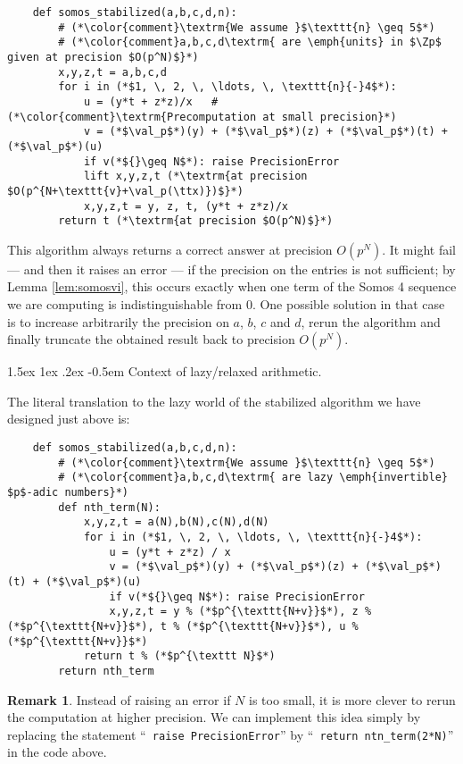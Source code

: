 \documentclass[11pt]{article}
\makeatletter
\numberwithin{equation}{section}
\numberwithin{figure}{section}
\renewcommand\subparagraph{\@startsection{subparagraph}{5}{\z@}%
                                       {1.5ex \@plus1ex \@minus .2ex}%
                                       {-0.5em}%
                                      {\normalfont\normalsize\it}}
\renewcommand{\geq}{\geqslant}
\theoremstyle{definition}
\newtheorem{rem}[theo]{Remark}
\newcommand{\Z}{\mathbb Z}
\newcommand{\Zp}{\Z_p}
\newcommand{\val}{\text{\rm val}}
\newcommand{\ttx}{\texttt{\rm x}\xspace}
\makeatother
\begin{document}
\begin{lstlisting}
    def somos_stabilized(a,b,c,d,n):
        # (*\color{comment}\textrm{We assume }$\texttt{n} \geq 5$*)
        # (*\color{comment}a,b,c,d\textrm{ are \emph{units} in $\Zp$ given at precision $O(p^N)$}*)
        x,y,z,t = a,b,c,d
        for i in (*$1, \, 2, \, \ldots, \, \texttt{n}{-}4$*):
            u = (y*t + z*z)/x   # (*\color{comment}\textrm{Precomputation at small precision}*)
            v = (*$\val_p$*)(y) + (*$\val_p$*)(z) + (*$\val_p$*)(t) + (*$\val_p$*)(u)
            if v(*${}\geq N$*): raise PrecisionError
            lift x,y,z,t (*\textrm{at precision $O(p^{N+\texttt{v}+\val_p(\ttx)})$}*)
            x,y,z,t = y, z, t, (y*t + z*z)/x
        return t (*\textrm{at precision $O(p^N)$}*)
\end{lstlisting}

\noindent
This algorithm always returns a correct answer at precision $O(p^N)$. 
It might fail --- and then it raises an error --- if the precision on the 
entries is not sufficient; by Lemma \ref{lem:somosvi}, this occurs 
exactly when one term of the Somos 4 sequence we are computing is 
indistinguishable from $0$. One possible solution in that case is to 
increase arbitrarily the precision on $a$, $b$, $c$ and $d$, rerun the 
algorithm and finally truncate the obtained result back to precision 
$O(p^N)$.

\subparagraph{Context of lazy/relaxed arithmetic.}

The literal translation to the lazy world of the stabilized algorithm 
we have designed just above is:

\begin{lstlisting}
    def somos_stabilized(a,b,c,d,n):
        # (*\color{comment}\textrm{We assume }$\texttt{n} \geq 5$*)
        # (*\color{comment}a,b,c,d\textrm{ are lazy \emph{invertible} $p$-adic numbers}*)
        def nth_term(N):
            x,y,z,t = a(N),b(N),c(N),d(N)
            for i in (*$1, \, 2, \, \ldots, \, \texttt{n}{-}4$*):
                u = (y*t + z*z) / x
                v = (*$\val_p$*)(y) + (*$\val_p$*)(z) + (*$\val_p$*)(t) + (*$\val_p$*)(u)
                if v(*${}\geq N$*): raise PrecisionError
                x,y,z,t = y % (*$p^{\texttt{N+v}}$*), z % (*$p^{\texttt{N+v}}$*), t % (*$p^{\texttt{N+v}}$*), u % (*$p^{\texttt{N+v}}$*)
            return t % (*$p^{\texttt N}$*)
        return nth_term
\end{lstlisting}

\begin{rem}
Instead of raising an error if $N$ is too small, it is more clever to
rerun the computation at higher precision. We can implement this idea
simply by replacing
the statement ``\texttt{{\color{blue} raise} PrecisionError}'' by
``\texttt{{\color{blue} return} ntn\_term(2*N)}'' in the code above.
\end{rem}
\end{document}
